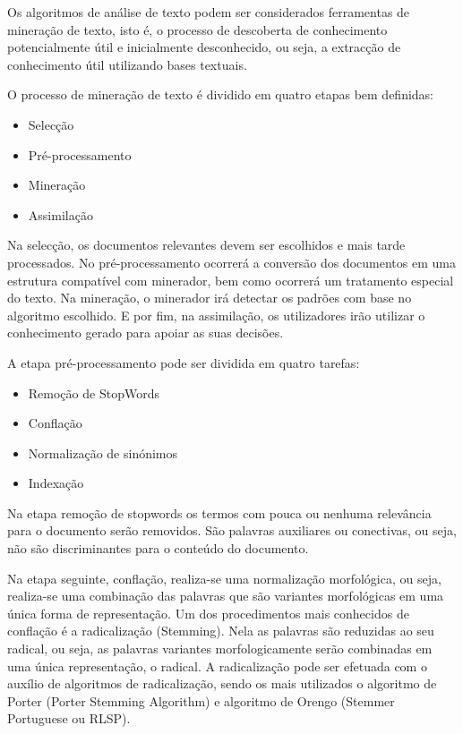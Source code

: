 \documentclass[a4paper,10pt]{article}
\begin{document}
Os algoritmos de análise de texto podem ser considerados ferramentas de mineração de texto, isto é, o processo de descoberta de conhecimento potencialmente útil e inicialmente desconhecido, ou seja, a extracção de conhecimento útil utilizando bases textuais.

O processo de mineração de texto é dividido em quatro etapas bem definidas:
\begin{itemize}
    \item Selecção
    \item Pré-processamento
    \item Mineração
    \item Assimilação
\end{itemize}

Na selecção, os documentos relevantes devem ser escolhidos e mais tarde processados.
No pré-processamento ocorrerá a conversão dos documentos em uma estrutura compatível com minerador, bem como ocorrerá um tratamento especial do texto.
Na mineração, o minerador irá detectar os padrões com base no algoritmo escolhido.
E por fim, na assimilação, os utilizadores irão utilizar o conhecimento gerado para apoiar as suas decisões.

A etapa pré-processamento pode ser dividida em quatro tarefas:
\begin{itemize}
    \item Remoção de StopWords
    \item Conflação
    \item Normalização de sinónimos
    \item Indexação
\end{itemize}

Na etapa remoção de stopwords os termos com pouca ou nenhuma relevância para o documento serão removidos.
São palavras auxiliares ou conectivas, ou seja, não são discriminantes para o conteúdo do documento.

Na etapa seguinte, conflação, realiza-se uma normalização morfológica, ou seja, realiza-se uma combinação das palavras que são variantes morfológicas em uma única forma de representação.
Um dos procedimentos mais conhecidos de conflação é a radicalização (Stemming).
Nela as palavras são reduzidas ao seu radical, ou seja, as palavras variantes morfologicamente serão combinadas em uma única representação, o radical.
A radicalização pode ser efetuada com o auxílio de algoritmos de radicalização, sendo os mais utilizados o algoritmo de Porter (Porter Stemming Algorithm) e algoritmo de Orengo (Stemmer Portuguese ou RLSP).
\end{document}
